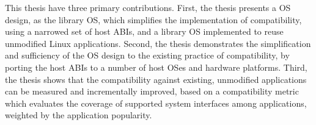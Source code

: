 This thesis have three primary contributions. First, the thesis presents a OS design, as the \graphene{} library OS, which simplifies the implementation of compatibility, using a narrowed set of host ABIs, and a library OS implemented to reuse unmodified Linux applications.
Second, the thesis demonstrates the simplification and sufficiency of the OS design to the existing practice of compatibility, by porting the host ABIs to a number of host OSes and hardware platforms. Third, the thesis shows that the compatibility against existing, unmodified applications can be measured and incrementally improved, based on a compatibility metric which evaluates the coverage of supported system interfaces among applications, weighted by the application popularity.


\begin{comment}
\paragraph{Contributions.}
This thesis proposes the challenges, solutions and principles,
to mitigate limitations from innovative system designs on enabling the execution of legacy applications.
The following list describes the contributions of the thesis,
from a technical view:

\begin{compactitem}

\item A Linux-compatible \libos{} called \emph{\graphene{}}~\cite{tsai14graphene},
which runs legacy Linux applications in a platform independent environment.
The platforms where \graphene{} has been ported
include Linux, FreeBSD, OSX,
Windows and \sgx{} enclaves (also called \emph{\graphenesgx{}}).
\graphene{} extends the security isolation on single-process applications,
to processes that share UNIX multi-process abstractions,
such as forking, signaling, sharing file descriptors, \sysvipc{}, etc.
The shared states across multiple processes of an application
is coordinated by the distributed implementation of OS states in \graphene{},
over the host-provided RPC streams.
Besides an optional host abstraction ---
bulk IPC for optimizing copy-on-write forking ---
all multi-process abstractions are
implemented and coordinated completely over PRC streams,
a feature generally provided by most platforms.


\end{comment}
